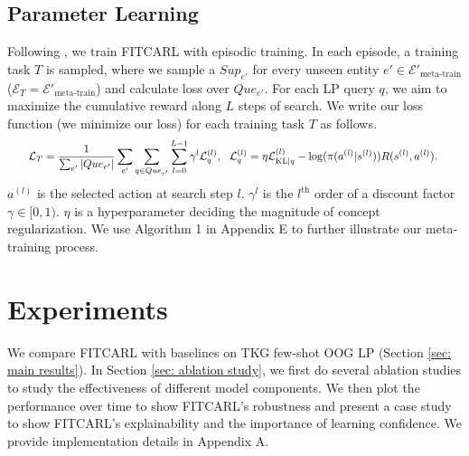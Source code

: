 \documentclass[runningheads]{llncs}
\begin{document}
\subsection{Parameter Learning}
Following \cite{ding2022few}, we train FITCARL with episodic training. In each episode, a training task $T$ is sampled, where we sample a $Sup_{e'}$ for every unseen entity $e' \in \mathcal{E}'_{\text{meta-train}}$ ($\mathcal{E}_T = \mathcal{E}'_{\text{meta-train}}$) and calculate loss over $Que_{e'}$. For each LP query $q$, we aim to maximize the cumulative reward along $L$ steps of search. We write our loss function (we minimize our loss) for each training task $T$ as follows.
\begin{equation}
\label{eq: loss}
\resizebox{0.95\columnwidth}{!}{%
$
\begin{aligned}
    &\mathcal{L}_T = \frac{1}{\sum_{e'} |Que_{e'}|}\sum_{e'} \sum_{q \in Que_{e'}} \sum_{l=0}^{L-1}
    \gamma^l \mathcal{L}_q^{(l)}, \ \  \mathcal{L}_q^{(l)} = \eta \mathcal{L}_{\text{KL}|q}^{(l)} -
    \log(\pi(a^{(l)}|s^{(l)}))R(s^{(l)}, a^{(l)}).\\
\end{aligned}
$
}
\end{equation}
$a^{(l)}$ is the selected action at search step $l$. $\gamma^l$ is the $l^{\text{th}}$ order of a 
discount factor $\gamma \in [0,1)$. $\eta$ is a hyperparameter deciding the magnitude of concept regularization. We use Algorithm 1 in Appendix E to further illustrate our meta-training process.
\section{Experiments}
We compare FITCARL with baselines on TKG few-shot OOG LP (Section \ref{sec: main results}). In Section \ref{sec: ablation study}, we first do several ablation studies to study the effectiveness of different model components. We then plot the performance over time to show FITCARL's robustness and present a case study to show FITCARL's explainability and the importance of learning confidence. We provide implementation details in Appendix A.
\end{document}
